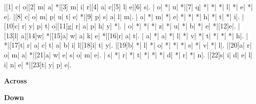 \documentclass[twocolumn]{article}
\begin{document}
\pagestyle{empty}\raggedright
\begin{Puzzle}{13}{13}
  |[1] c|    o|[2] m|    a|    *|[3] m|    i|    r|[4] a|    c|[5] l|    e|[6] s|.
  |    o|    *|    u|    *|[7] q|    *|    *|    *|    l|    *|    e|    *|    e|.
  |[8] c|    o|    m|    p|    u|    t|    e|    *|[9] p|    s|    a|    l|    m|.
  |    a|    *|    m|    *|    e|    *|    *|    *|    h|    *|    t|    *|    i|.
  |[10]c|    r|    y|    p|    t|    o|[11]g|    r|    a|    p|    h|    y|    *|.
  |    o|    *|    *|    *|    z|    *|    u|    *|    b|    *|    e|    *|[12]e|.
  |[13]l|    a|[14]w|    *|[15]a|    w|    a|    k|    e|    *|[16]r|    a|    t|.
  |    a|    *|    a|    *|    l|    *|    v|    *|    t|    *|    *|    *|    h|.
  |    *|[17]t|    r|    a|    c|    t|    a|    b|    i|    l|[18]i|    t|    y|.
  |[19]b|    *|    l|    *|    o|    *|    *|    *|    s|    *|    v|    *|    l|.
  |[20]a|    r|    o|    m|    a|    *|[21]a|    w|    e|    s|    o|    m|    e|.
  |    s|    *|    r|    *|    t|    *|    *|    *|    d|    *|    r|    *|    n|.
  |[22]s|    i|    d|    e|    l|    i|    n|    e|    *|[23]t|    y|    p|    e|.
\end{Puzzle}

\begin{PuzzleClues}{\textbf{Across}}
\end{PuzzleClues}


\begin{PuzzleClues}{\textbf{Down}}
\end{PuzzleClues}
\end{document}
